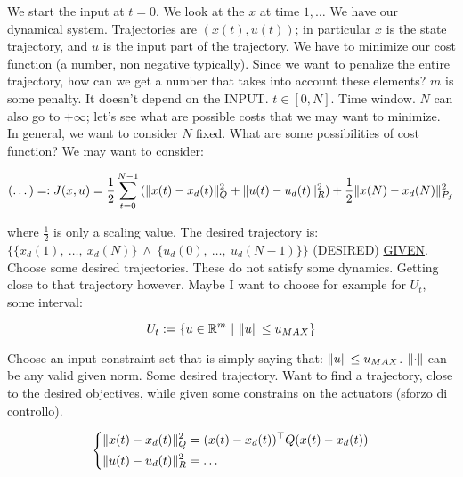 We start the input at $t=0$. We look at the $x$ at time $1,\dots$ We have our dynamical system. Trajectories are $(x(t),u(t))$; in particular $x$ is the state trajectory, and $u$ is the input part of the trajectory. We have to minimize our cost function (a number, non negative typically). Since we want to penalize the entire trajectory, how can we get a number that takes into account these elements? $m$ is some penalty. It doesn't depend on the INPUT. $t\in[0,N]$. Time window. $N$ can also go to $+\infty$; let's see what are possible costs that we may want to minimize. In general, we want to consider $N$ fixed. What are some possibilities of cost function? We may want to consider:

\[
	(\dots) =: J(x,u) = \frac{1}{2}\sum_{t=0}^{N-1}{(\lVert x(t)-x_d(t)\rVert^2_Q + \lVert u(t)-u_d(t)\rVert^2_R)} + \frac{1}{2}\lVert x(N)-x_d(N)\rVert^2_{P_f}
\]

where $\frac{1}{2}$ is only a scaling value. The desired trajectory is: $\{\{x_d(1),\ \dots,\ x_d(N)\}\ \land\ \{u_d(0),\ \dots,\ u_d(N-1)\}\}$ (DESIRED) \underline{GIVEN}. Choose some desired trajectories. These do not satisfy some dynamics. Getting close to that trajectory however. Maybe I want to choose for example for $U_t$, some interval:

\[
	U_t := \{u\in\mathbb{R}^m\ |\ \lVert u\rVert\leq u_{MAX}\}
\]

Choose an input constraint set that is simply saying that: $\lVert u\rVert\leq u_{MAX}$. $\lVert\mathord{\cdot}\rVert$ can be any valid given norm. Some desired trajectory. Want to find a trajectory, close to the desired objectives, while given some constrains on the actuators (sforzo di controllo).

\[
	\left\{
	\begin{aligned}
	&\lVert x(t)-x_d(t)\rVert^2_Q = (x(t)-x_d(t))^\top Q(x(t)-x_d(t))\\
	&\lVert u(t)-u_d(t)\rVert^2_R = \dots
	\end{aligned}
	\right.
\]

